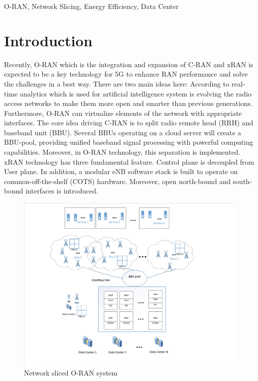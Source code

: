 \documentclass[conference]{IEEEtran}
\begin{document}
\begin{IEEEkeywords}
O-RAN, Network Slicing, Energy Efficiency, Data Center
\end{IEEEkeywords}

\section{Introduction}
Recently, O-RAN which is the integration and expansion of C-RAN and xRAN is expected to be a key technology for 5G to enhance RAN performance and solve the challenges in a best way.  
There are two main ideas here: According to real-time analytics which is used for artificial intelligence system is evolving the radio access networks to make them more open and smarter than previous generations. Furthermore, O-RAN can virtualize elements of the network with  appropriate interfaces. \newline
The core idea driving C-RAN is to split radio remote head (RRH) and baseband unit (BBU). Several BBUs operating on a cloud server will create a BBU-pool, providing unified baseband signal processing with powerful computing capabilities. Moreover, in O-RAN technology, this separation is implemented.\newline
xRAN technology has three fundamental feature. Control plane is decoupled from User plane. In addition, a modular eNB software stack is built to operate on common-off-the-shelf (COTS) hardware. Moreover, open north-bound and south-bound interfaces is introduced.
\begin{figure}[H]
  \centering
    \includegraphics[scale=0.45]{c2}
  \caption{Network sliced O-RAN system}
  \label{fig:c11}
\end{figure} 
\end{document}
